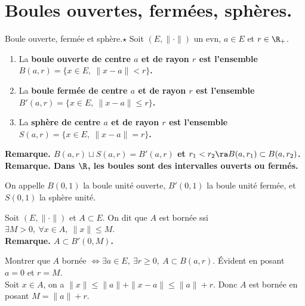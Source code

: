 \documentclass[11pt]{article}
\begin{document}
\vspace*{-0.8cm}

\section{Boules ouvertes, fermées, sphères.}

\begin{defi}{Boule ouverte, fermée et sphère.$\star$}{}
    Soit $(E,\|\cdot\|)$ un evn, $a\in E$ et $r\in\R_+$.
    \begin{enumerate}
        \item La \bf{boule ouverte} de centre $a$ et de rayon $r$ est l'ensemble $B(a,r)=\{x\in E, ~ \|x-a\| < r\}$.
        \item La \bf{boule fermée} de centre $a$ et de rayon $r$ est l'ensemble $B'(a,r)=\{x\in E, ~ \|x-a\|\leq r\}$.
        \item La \bf{sphère} de centre $a$ et de rayon $r$ est l'ensemble $S(a,r)=\{x\in E, ~ \|x-a\|=r\}$.
    \end{enumerate}
    \bf{Remarque.} $B(a,r)\sqcup S(a,r) = B'(a,r)$ et $r_1<r_2 \ra B(a,r_1)\subset B(a,r_2)$.\\
    \bf{Remarque.} Dans $\R$, les boules sont des intervalles ouverts ou fermés.
\end{defi}

\vspace*{-0.8cm}

\begin{nota}{}{}
    On appelle $B(0,1)$ la boule unité ouverte, $B'(0,1)$ la boule unité fermée, et $S(0,1)$ la sphère unité.
\end{nota}

\vspace*{-0.8cm}

\begin{defi}{}{}
    Soit $(E,\|\cdot\|)$ et $A\subset E$. On dit que $A$ est bornée ssi $\exists M > 0, ~ \forall x \in A, ~ \|x\|\leq M$.\\
    \bf{Remarque.} $A\subset B'(0,M)$.
\end{defi}

\vspace*{-0.8cm}

\begin{ex}{}{}
    Montrer que $A$ bornée $\iff \exists a \in E, ~ \exists r \geq 0, ~ A\subset B(a,r)$.
    \tcblower
    \boxed{\ra} Évident en posant $a=0$ et $r=M$.\\
    \boxed{\la} Soit $x\in A$, on a $\|x\|\leq \|a\| + \|x - a\| \leq \|a\| + r$. Donc $A$ est bornée en posant $M=\|a\|+r$. 
\end{ex}
\end{document}
